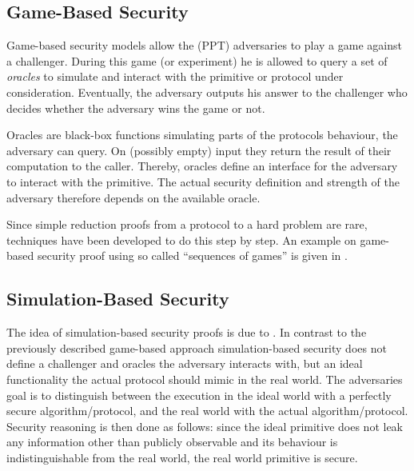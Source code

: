 \subsection{Game-Based Security}
Game-based security models allow the (\ac{PPT}) adversaries to play a game against a challenger.
During this game (or experiment) he is allowed to query a set of \emph{oracles} to simulate and interact with the primitive or protocol under consideration.
Eventually, the adversary outputs his answer to the challenger who decides whether the adversary wins the game or not.

Oracles are black-box functions simulating parts of the protocols behaviour, the adversary can query.
On (possibly empty) input they return the result of their computation to the caller.
Thereby, oracles define an interface for the adversary to interact with the primitive.
The actual security definition and strength of the adversary therefore depends on the available oracle.

Since simple reduction proofs from a protocol to a hard problem are rare, techniques have been developed to do this step by step.
An example on game-based security proof using so called ``sequences of games'' is given in \cite{Shoup2004}.

\subsection{Simulation-Based Security}
The idea of simulation-based security proofs is due to \citet{Goldreich87}.
In contrast to the previously described game-based approach simulation-based security does not define a challenger and oracles the adversary interacts with, but an ideal functionality the actual protocol should mimic in the real world.
The adversaries goal is to distinguish between the execution in the ideal world with a perfectly secure algorithm/protocol, and the real world with the actual algorithm/protocol.
Security reasoning is then done as follows: since the ideal primitive does not leak any information other than publicly observable and its behaviour is indistinguishable from the real world, the real world primitive is secure.

